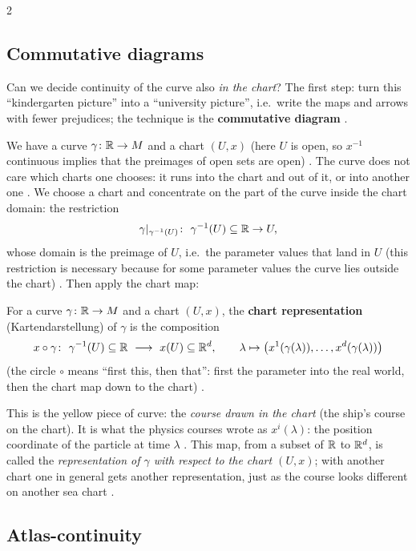 \begin{paracol}{2}
\subsection{Commutative diagrams}\label{ssec:dm-diagrams}

Can we decide continuity of the curve also \emph{in the chart}? The first step: turn this ``kindergarten picture'' into a
``university picture'', i.e.\ write the maps and arrows with fewer prejudices; the technique is the \textbf{commutative
diagram} .

We have a curve $\gamma\colon\mathbb{R}\to M$ and a chart $(U,x)$ (here $U$ is open, so $x^{-1}$ continuous implies that the preimages of
open sets are open) . The curve does not care which charts one chooses: it runs
into the chart and out of it, or into another one . We choose a chart and concentrate on the part of the
curve inside the chart domain: the restriction
\[
  \gamma|_{\gamma^{-1}(U)}\colon\ \gamma^{-1}(U)\subseteq\R\to U ,
\]
whose domain is the preimage of $U$, i.e.\ the parameter values that land in $U$ (this restriction is necessary because for
some parameter values the curve lies outside the chart) .
Then apply the chart map:

\begin{definition}\label{def:dm-chartrep}
For a curve $\gamma\colon\mathbb{R}\to M$ and a chart $(U,x)$, the \textbf{chart representation} (Kartendarstellung)
of $\gamma$ is the composition
\[
  x\circ\gamma\colon\ \gamma^{-1}(U)\subseteq\R\ \longrightarrow\ x(U)\subseteq\R^d,\qquad
  \lambda\mapsto\bigl(x^1(\gamma(\lambda)),\dots,x^d(\gamma(\lambda))\bigr)
\]
(the circle $\circ$ means ``first this, then that'': first the parameter into the real world, then the chart map down to the chart)
.
\end{definition}
This is the yellow piece of curve: the \emph{course drawn in the chart} (the ship's course on the chart). It is what the
physics courses wrote as $x^i(\lambda)$: the position coordinate of the particle at time $\lambda$
. This map, from a subset of $\mathbb{R}$ to $\mathbb{R}^d$, is called the
\emph{representation of $\gamma$ with respect to the chart $(U,x)$}; with another chart one in general gets another
representation, just as the course looks different on another sea chart .

\subsection{Atlas-continuity}\label{ssec:dm-atlas-cont}


\end{paracol}
